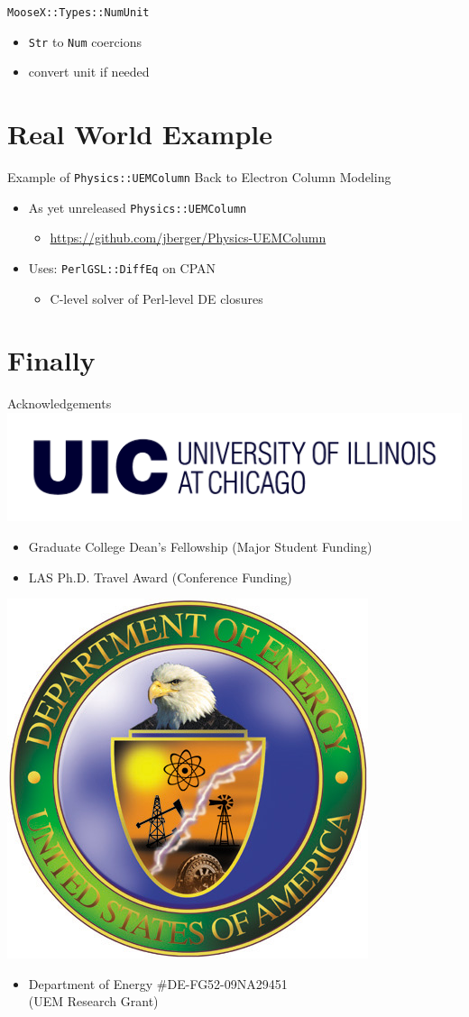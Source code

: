 \documentclass[mathserif]{beamer}
\providecommand{\code}[1]{{\texttt{\scriptsize{#1}}}}
\begin{document}
\begin{frame}{\texttt{MooseX::Types::NumUnit}}
  \begin{itemize}
    \item \code{Str} to \code{Num} coercions
    \item convert unit if needed
  \end{itemize}
  \begin{block}{}
    \scriptsize
    
  \end{block}
\end{frame}

\section{Real World Example}

\begin{frame}{Example of \texttt{Physics::UEMColumn}}
  Back to Electron Column Modeling
  
  \begin{itemize}
    \item As yet unreleased \code{Physics::UEMColumn}
    \begin{itemize}
      \item \url{https://github.com/jberger/Physics-UEMColumn}
    \end{itemize}
    \item Uses: \code{PerlGSL::DiffEq} on CPAN
    \begin{itemize}
      \item C-level solver of Perl-level DE closures
    \end{itemize}
  \end{itemize}
\end{frame}

\section{Finally}

\begin{frame}{Acknowledgements}
  \includegraphics[width=0.7\linewidth]{uic}
  \begin{itemize}
    \item Graduate College Dean's Fellowship (Major Student Funding)
    \item LAS Ph.D. Travel Award (Conference Funding)
  \end{itemize}
  \includegraphics[width=0.15\linewidth]{doe}
  \begin{itemize}
    \item Department of Energy \#DE-FG52-09NA29451\\(UEM Research Grant)
  \end{itemize}
\end{frame}
\end{document}
